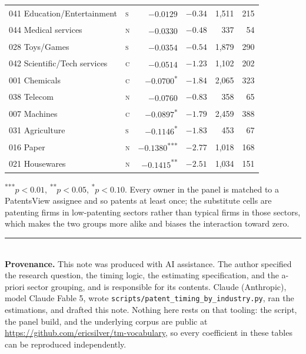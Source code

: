 \documentclass[11pt]{article}
\begin{document}
\begin{longtable}{llrrrr}
041 Education/Entertainment & \textsc{s} & $-0.0129$\textsuperscript{} & $-0.34$ & 1,511 & 215 \\
044 Medical services & \textsc{n} & $-0.0330$\textsuperscript{} & $-0.48$ & 337 & 54 \\
028 Toys/Games & \textsc{s} & $-0.0354$\textsuperscript{} & $-0.54$ & 1,879 & 290 \\
042 Scientific/Tech services & \textsc{c} & $-0.0514$\textsuperscript{} & $-1.23$ & 1,102 & 202 \\
001 Chemicals & \textsc{c} & $-0.0700$\textsuperscript{*} & $-1.84$ & 2,065 & 323 \\
038 Telecom & \textsc{n} & $-0.0760$\textsuperscript{} & $-0.83$ & 358 & 65 \\
007 Machines & \textsc{c} & $-0.0897$\textsuperscript{*} & $-1.79$ & 2,459 & 388 \\
031 Agriculture & \textsc{s} & $-0.1146$\textsuperscript{*} & $-1.83$ & 453 & 67 \\
016 Paper & \textsc{n} & $-0.1380$\textsuperscript{***} & $-2.77$ & 1,018 & 168 \\
021 Housewares & \textsc{n} & $-0.1415$\textsuperscript{**} & $-2.51$ & 1,034 & 151 \\
\bottomrule\end{longtable}
\vspace{-1em}\noindent\footnotesize\textsuperscript{***}$p<0.01$, \textsuperscript{**}$p<0.05$, \textsuperscript{*}$p<0.10$. Every owner in the panel is matched to a PatentsView assignee and so patents at least once; the substitute cells are patenting firms in low-patenting sectors rather than typical firms in those sectors, which makes the two groups more alike and biases the interaction toward zero.
\vspace{1.2em}\noindent\rule{\linewidth}{0.4pt}\\[0.4em]
\noindent\footnotesize\textbf{Provenance.} This note was produced with AI assistance. The author specified the research question, the timing logic, the estimating specification, and the a-priori sector grouping, and is responsible for its contents. Claude (Anthropic), model Claude Fable 5, wrote \texttt{scripts/patent\_timing\_by\_industry.py}, ran the estimations, and drafted this note. Nothing here rests on that tooling: the script, the panel build, and the underlying corpus are public at \url{https://github.com/ericsilver/tm-vocabulary}, so every coefficient in these tables can be reproduced independently.
\end{document}
